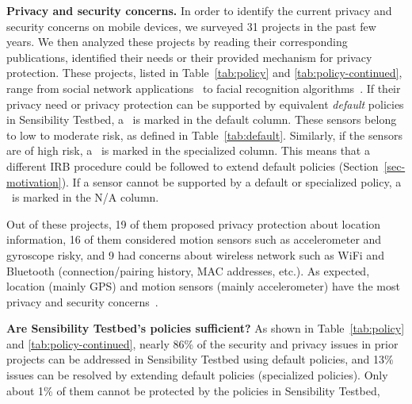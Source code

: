\textbf{Privacy and security concerns.}
In order to identify the current privacy and security concerns on mobile 
devices, we surveyed 31 projects in the past few years. We then analyzed
these projects by reading their corresponding publications, identified 
their needs or their provided mechanism for privacy protection. 
These projects, listed in Table~\ref{tab:policy} and \ref{tab:policy-continued},
range from social network applications~\cite{aditya2014encore} to facial
recognition algorithms~\cite{chen2014sensor}. If their privacy need or privacy
protection can be supported by equivalent \textit{default} policies in Sensibility 
Testbed, a \tickmark\ is marked in the default column. These sensors belong to 
low to moderate risk, as defined in Table~\ref{tab:default}. Similarly, if the
sensors are of high risk, a \tickmark\ is marked in the specialized column. 
This means that a different IRB procedure could be followed to extend 
default policies (Section~\ref{sec-motivation}). If a sensor cannot be 
supported by a default or specialized policy, a \xmark\ is marked in the 
N/A column. 

Out of these projects, 
19 of them proposed privacy protection about location information, 16 of 
them considered motion sensors such as accelerometer and gyroscope 
risky, and 9 had concerns about wireless network such as WiFi and Bluetooth
(connection/pairing history, MAC addresses, etc.). As expected, location (mainly GPS)
and motion sensors (mainly accelerometer) have the most privacy and security 
concerns~\cite{chakraborty2014ipshield}.

\textbf{Are Sensibility Testbed's policies sufficient?}
As shown in Table~\ref{tab:policy} and \ref{tab:policy-continued}, nearly 86\% 
of the security and privacy issues in prior projects can be addressed in 
Sensibility Testbed using default policies, and 13\% issues can be resolved by extending 
default policies (specialized policies). Only about 1\% of them cannot
be protected by the policies in Sensibility Testbed, 


